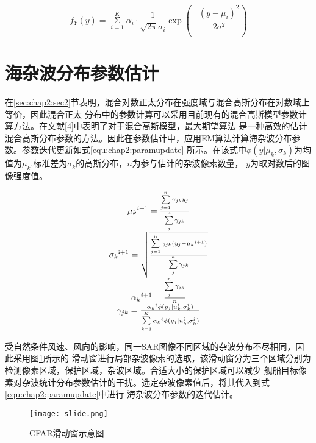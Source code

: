     \begin{equation}
      \label{equ:chap2:GMM}
        {f_Y}(y) = \mathop \Sigma \limits_{i = 1}^K {\alpha _i} \cdot \frac{1}{{\sqrt {2\pi } {\sigma _i}}}\exp ( - \frac{{{{(y - {\mu _i})}^2}}}{{2{\sigma ^2}}})
    \end{equation}


  \section{海杂波分布参数估计}

      在\ref{sec:chap2:sec2}节表明，混合对数正太分布在强度域与混合高斯分布在对数域上等价，因此混合正太
      分布中的参数计算可以采用目前现有的混合高斯模型参数计算方法。在文献[4]中表明了对于混合高斯模型，最大期望算法
      是一种高效的估计混合高斯分布参数的方法。因此在参数估计中，应用EM算法计算海杂波分布参数。参数迭代更新如式\ref{equ:chap2:paramupdate}
      所示。在该式中$\phi (y|{\mu _k},{\sigma _k})$为均值为$\mu_k$,标准差为$\sigma_k$的高斯分布，$n$为参与估计的杂波像素数量，
      $y$为取对数后的图像强度值。      

    \begin{equation}
      \label{equ:chap2:paramupdate}
      \begin{array}{*{20}{c}}
        {{\mu _k}^{i + 1} = \frac{{\sum\limits_{j = 1}^n {{\gamma _{jk}}{y_j}} }}{{\sum\limits_j^n {{\gamma _{jk}}} }}}\\
        {{\sigma _k}^{{\rm{i}} + 1} = \sqrt {\frac{{\sum\limits_{j = 1}^n {{\gamma _{jk}}({y_j} - {\mu _k}^{i + 1})} }}{{\sum\limits_j^n {{\gamma _{jk}}} }}} }\\
        {{\alpha _k}^{i + 1} = \frac{{\sum\limits_j^n {{\gamma _{jk}}} }}{n}}\\
        {{\gamma _{jk}} = \frac{{{\alpha _k}^i\phi ({y_j}|u_k^i,\sigma _k^i)}}{{\sum\limits_{k = 1}^K {{\alpha _k}^i\phi ({y_j}|u_k^i,\sigma _k^i)} }}}
      \end{array}
    \end{equation}

    受自然条件风速、风向的影响，同一SAR图像不同区域的杂波分布不尽相同，因此采用图\ref{fig:chap2:slide}所示的
    滑动窗进行局部杂波像素的选取，该滑动窗分为三个区域分别为检测像素区域，保护区域，杂波区域。合适大小的保护区域可以减少
    舰船目标像素对杂波统计分布参数估计的干扰。选定杂波像素值后，将其代入到式\ref{equ:chap2:paramupdate}中进行
    海杂波分布参数的迭代估计。

    \begin{figure}[H] %
      \centering
      \texttt{[image: slide.png]}
      \caption{CFAR滑动窗示意图}
      \label{fig:chap2:slide}
    \end{figure}   
